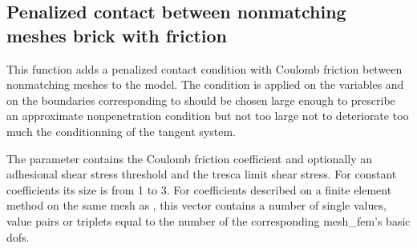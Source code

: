 \documentclass[a4paper,11pt,english]{sphinxmanual}
\begin{document}
\subsection{Penalized contact between non\sphinxhyphen{}matching meshes brick with friction}
\label{\detokenize{userdoc/model_contact_friction:penalized-contact-between-non-matching-meshes-brick-with-friction}}
\begin{sphinxVerbatim}[commandchars=\\\{\}]
         
            
             
\end{sphinxVerbatim}

This function adds a penalized contact condition with Coulomb friction between
nonmatching meshes to the model.
The condition is applied on the variables  and 
on the boundaries corresponding to  should be chosen
large enough to prescribe an approximate non\sphinxhyphen{}penetration condition
but not too large not to deteriorate too much the conditionning of
the tangent system.

The parameter  contains the Coulomb friction
coefficient and optionally an adhesional shear stress threshold and the
tresca limit shear stress. For constant coefficients its size is from
1 to 3. For coefficients described on a finite element method on the
same mesh as , this vector contains a number of single
values, value pairs or triplets equal to the number of the
corresponding mesh\_fem’s basic dofs.
\end{document}
